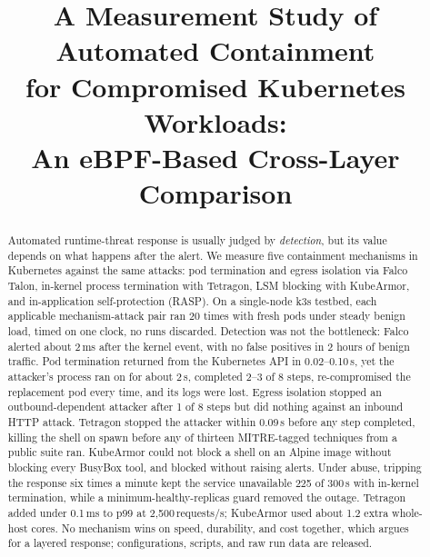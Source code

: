 \documentclass[10pt,conference]{IEEEtran}
\begin{document}
\title{A Measurement Study of Automated Containment\\for Compromised Kubernetes Workloads:\\An eBPF-Based Cross-Layer Comparison}

\author{%
\vspace{4pt}
}

\maketitle

\begin{abstract}
Automated runtime-threat response is usually judged by \emph{detection}, but its value depends on what happens after the alert. We measure five containment mechanisms in Kubernetes against the same attacks: pod termination and egress isolation via Falco Talon, in-kernel process termination with Tetragon, LSM blocking with KubeArmor, and in-application self-protection (RASP). On a single-node k3s testbed, each applicable mechanism-attack pair ran 20 times with fresh pods under steady benign load, timed on one clock, no runs discarded. Detection was not the bottleneck: Falco alerted about 2\,ms after the kernel event, with no false positives in 2 hours of benign traffic. Pod termination returned from the Kubernetes API in 0.02--0.10\,s, yet the attacker's process ran on for about 2\,s, completed 2--3 of 8 steps, re-compromised the replacement pod every time, and its logs were lost. Egress isolation stopped an outbound-dependent attacker after 1 of 8 steps but did nothing against an inbound HTTP attack. Tetragon stopped the attacker within 0.09\,s before any step completed, killing the shell on spawn before any of thirteen MITRE-tagged techniques from a public suite ran. KubeArmor could not block a shell on an Alpine image without blocking every BusyBox tool, and blocked without raising alerts. Under abuse, tripping the response six times a minute kept the service unavailable 225 of 300\,s with in-kernel termination, while a minimum-healthy-replicas guard removed the outage. Tetragon added under 0.1\,ms to p99 at 2{,}500\,requests/s; KubeArmor used about 1.2 extra whole-host cores. No mechanism wins on speed, durability, and cost together, which argues for a layered response; configurations, scripts, and raw run data are released.
\end{abstract}
\end{document}
